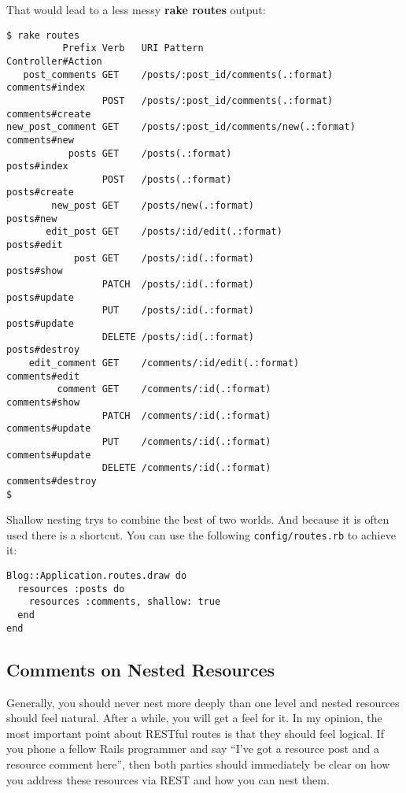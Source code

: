\documentclass[a4paper]{book}
\begin{document}
That would lead to a less messy \textbf{rake routes} output:

\begin{shaded}\begin{verbatim}
$ rake routes
          Prefix Verb   URI Pattern                            Controller#Action
   post_comments GET    /posts/:post_id/comments(.:format)     comments#index
                 POST   /posts/:post_id/comments(.:format)     comments#create
new_post_comment GET    /posts/:post_id/comments/new(.:format) comments#new
           posts GET    /posts(.:format)                       posts#index
                 POST   /posts(.:format)                       posts#create
        new_post GET    /posts/new(.:format)                   posts#new
       edit_post GET    /posts/:id/edit(.:format)              posts#edit
            post GET    /posts/:id(.:format)                   posts#show
                 PATCH  /posts/:id(.:format)                   posts#update
                 PUT    /posts/:id(.:format)                   posts#update
                 DELETE /posts/:id(.:format)                   posts#destroy
    edit_comment GET    /comments/:id/edit(.:format)           comments#edit
         comment GET    /comments/:id(.:format)                comments#show
                 PATCH  /comments/:id(.:format)                comments#update
                 PUT    /comments/:id(.:format)                comments#update
                 DELETE /comments/:id(.:format)                comments#destroy
$
\end{verbatim}\end{shaded}

Shallow nesting trys to combine the best of two worlds. And because it is often used there is a shortcut. You can use the following \texttt{config/routes.rb} to achieve it:

\begin{shaded}\begin{verbatim}
Blog::Application.routes.draw do
  resources :posts do
    resources :comments, shallow: true
  end
end
\end{verbatim}\end{shaded}

\subsection{Comments on Nested Resources}\label{comments-on-nested-resources}

Generally, you should never nest more deeply than one level and nested resources should feel natural. After a while, you will get a feel for it. In my opinion, the most important point about RESTful routes is that they should feel logical. If you phone a fellow Rails programmer and say “I've got a resource post and a resource comment here”, then both parties should immediately be clear on how you address these resources via REST and how you can nest them.
\end{document}
